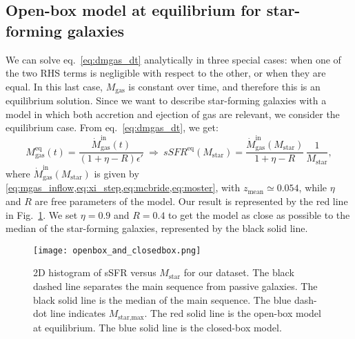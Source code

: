 \documentclass[fleqn,usenatbib]{mnras}
\begin{document}
\subsection{Open-box model at equilibrium for star-forming galaxies}\label{sec:open_box}
We can solve eq.~\ref{eq:dmgas_dt} analytically in three special cases: when one of the two RHS terms is negligible with respect to the other, or when they are equal. In this last case, $M_\text{gas}$ is constant over time, and therefore this is an equilibrium solution. Since we want to describe star-forming galaxies with a model in which both accretion and ejection of gas are relevant, we consider the equilibrium case. From eq.~\ref{eq:dmgas_dt}, we get:
{\fontsize{7.9pt}{7.9pt}\begin{equation}
    M^\text{eq}_\text{gas}(t) = \dfrac{\dot{M}_\text{gas}^\text{in}(t)}{(1+\eta-R)\epsilon'} \: \Rightarrow \: sSFR^\text{eq}\left(M_{\text{star}}\right) = \dfrac{\dot{M}_\text{gas}^\text{in}\left(M_{\text{star}}\right)}{1+\eta-R} \, \dfrac{1}{M_\text{star}},
	\label{eq:openbox_equilibrium}
\end{equation}}
where $\dot{M}_\text{gas}^\text{in}\left(M_{\text{star}}\right)$ is given by \cref{eq:mgas_inflow,eq:xi_step,eq:mcbride,eq:moster}, with $z_{\text{mean}} \simeq 0.054$, while $\eta$ and $R$ are free parameters of the model. Our result is represented by the red line in Fig.~\ref{fig:openbox_and_closedbox}. We set $\eta=0.9$ and $R=0.4$ to get the model as close as possible to the median of the star-forming galaxies, represented by the black solid line.

\begin{figure}\centering
	\texttt{[image: openbox\_and\_closedbox.png]}
    \caption{2D histogram of sSFR versus $M_\text{star}$ for our dataset. The black dashed line separates the main sequence from passive galaxies. The black solid line is the median of the main sequence. The blue dash-dot line indicates $M_\text{star,max}$. The red solid line is the open-box model at equilibrium. The blue solid line is the closed-box model.}
    \label{fig:openbox_and_closedbox}
\end{figure}
\end{document}
